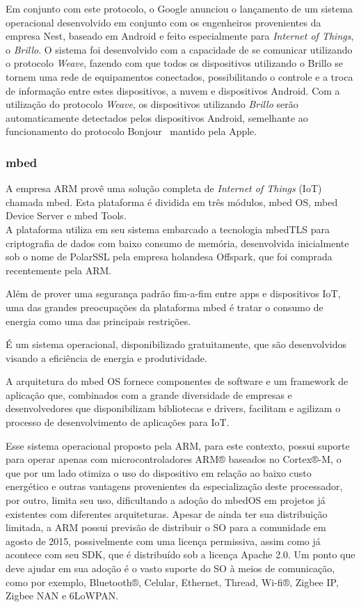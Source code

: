Em conjunto com este protocolo, o Google anunciou o lançamento de um sistema operacional desenvolvido em
conjunto com os engenheiros provenientes da empresa Nest, baseado em Android e feito especialmente para
\textit{Internet of Things}, o \textit{Brillo}. O sistema foi desenvolvido com a capacidade de se comunicar
utilizando o protocolo \textit{Weave}, fazendo com que todos os dispositivos utilizando o Brillo se tornem
uma rede de equipamentos conectados, possibilitando o controle e a troca de informação entre estes dispositivos,
a nuvem e dispositivos Android. Com a utilização do protocolo \textit{Weave}, os dispositivos utilizando \textit{Brillo}
serão automaticamente detectados pelos dispositivos Android, semelhante ao funcionamento do protocolo Bonjour~\cite{Bonjour}
mantido pela Apple.

\subsubsection{mbed}
\label{subsec:mbed}
A empresa ARM provê uma solução completa de \textit{Internet of Things} (IoT) chamada mbed\cite{mbed}.
Esta plataforma é dividida em três módulos, mbed OS, mbed Device Server e mbed Tools.\\
A plataforma utiliza em seu sistema embarcado a tecnologia mbedTLS para criptografia de dados com baixo
consumo de memória, desenvolvida inicialmente sob o nome de PolarSSL pela empresa holandesa Offspark,
que foi comprada recentemente pela ARM.

Além de prover uma segurança padrão fim-a-fim entre apps e dispositivos IoT, uma das grandes preocupações
da plataforma mbed é tratar o consumo de energia como uma das principais restrições.

É um sistema operacional, disponibilizado gratuitamente, que são desenvolvidos visando a eficiência
de energia e produtividade.

A arquitetura do mbed OS fornece componentes de software e um framework de aplicação que, combinados
com a grande diversidade de empresas e desenvolvedores que disponibilizam bibliotecas e drivers, facilitam
e agilizam o processo de desenvolvimento de aplicações para IoT.

Esse sistema operacional proposto pela ARM, para este contexto, possui suporte para operar apenas com microcontroladores
ARM® baseados no Cortex®-M, o que por um lado otimiza o uso do dispositivo em relação ao baixo custo energético
e outras vantagens provenientes da especialização deste processador, por outro, limita seu uso, dificultando
a adoção do mbedOS em projetos já existentes com diferentes arquiteturas.
Apesar de ainda ter sua distribuição limitada, a ARM possui previsão de distribuir o SO para a comunidade em agosto de 2015,
possivelmente com uma licença permissiva, assim como já acontece com seu SDK, que é distribuído sob a licença Apache 2.0.
Um ponto que deve ajudar em sua adoção é o vasto suporte do SO à meios de comunicação, como por exemplo,
Bluetooth®, Celular, Ethernet, Thread, Wi-fi®,  Zigbee IP, Zigbee NAN e 6LoWPAN.

